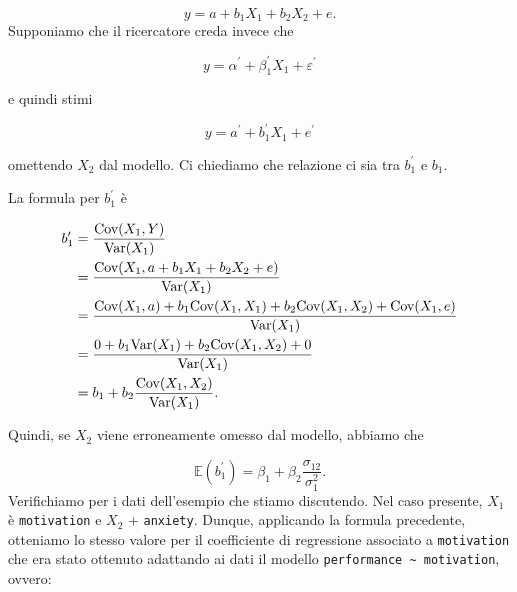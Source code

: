 \documentclass[
  11pt,
]{krantz}
\makeatletter
\newenvironment{Shaded}{\begin{snugshade}}{\end{snugshade}}
\newcommand{\CommentTok}[1]{\textcolor[rgb]{0.37,0.37,0.37}{\textit{#1}}}
\newcommand{\DecValTok}[1]{\textcolor[rgb]{0.06,0.06,0.06}{#1}}
\newcommand{\FunctionTok}[1]{\textcolor[rgb]{0,0,0}{#1}}
\newcommand{\NormalTok}[1]{#1}
\newcommand{\SpecialCharTok}[1]{\textcolor[rgb]{0,0,0}{#1}}
\newenvironment{kframe}{%
\medskip{}
\setlength{\fboxsep}{.8em}
 \def\at@end@of@kframe{}%
 \ifinner\ifhmode%
  \def\at@end@of@kframe{\end{minipage}}%
  \begin{minipage}{\columnwidth}%
 \fi\fi%
 \def\FrameCommand##1{\hskip\@totalleftmargin \hskip-\fboxsep
 \colorbox{shadecolor}{##1}\hskip-\fboxsep
     \hskip-\linewidth \hskip-\@totalleftmargin \hskip\columnwidth}%
 \MakeFramed {\advance\hsize-\width
   \@totalleftmargin\z@ \linewidth\hsize
   \@setminipage}}%
 {\par\unskip\endMakeFramed%
 \at@end@of@kframe}
\renewenvironment{Shaded}{\begin{kframe}}{\end{kframe}}
\makeatother
\begin{document}
\[
y = a + b_1 X_1 + b_2 X_2 + e.
\] Supponiamo che il ricercatore creda invece che

\[
y = \alpha^\prime + \beta_1^\prime X_1 + \varepsilon^\prime
\]

e quindi stimi

\[
y = a^\prime + b_1^\prime X_1 + e^\prime
\]

omettendo \(X_2\) dal modello. Ci chiediamo che relazione ci sia tra \(b_1^\prime\) e \(b_1\).

La formula per \(b_1^\prime\) è

\begin{equation}
\begin{aligned}
b_1^\prime &= \frac{\mbox{Cov}(X_1, Y)}{\mbox{Var}(X_1)}\notag\\
&= \frac{\mbox{Cov}(X_1, a + b_1 X_1 + b_2 X_2 + e)}{\mbox{Var}(X_1)}\notag\\
&= \frac{\mbox{Cov}(X_1, a)+b_1 \mbox{Cov}(X_1, X_1) + b_2 \mbox{Cov}(X_1, X_2) + \mbox{Cov}(X_1, e)}{\mbox{Var}(X_1)}\notag\\
&= \frac{0 + b_1 \mbox{Var}(X_1) + b_2 \mbox{Cov}(X_1, X_2) + 0}{\mbox{Var}(X_1)}\notag\\
&= b_1 + b_2 \frac{\mbox{Cov}(X_1, X_2)}{\mbox{Var}(X_1)}.
\end{aligned}
\end{equation}

Quindi, se \(X_2\) viene erroneamente omesso dal modello, abbiamo che

\[
\mathbb{E}(b_1^\prime) = \beta_1 + \beta_2 \frac{\sigma_{12}}{\sigma_1^2}.
\] Verifichiamo per i dati dell'esempio che stiamo discutendo. Nel caso presente, \(X_1\) è \texttt{motivation} e \(X_2\) + \texttt{anxiety}. Dunque, applicando la formula precedente, otteniamo lo stesso valore per il coefficiente di regressione associato a \texttt{motivation} che era stato ottenuto adattando ai dati il modello \texttt{performance\ \textasciitilde{}\ motivation}, ovvero:

\begin{Shaded}
\end{Shaded}
\end{document}

